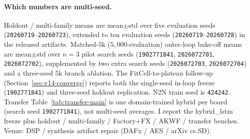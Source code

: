 \paragraph{Which numbers are multi-seed.}
Holdout / multi-family means are mean$\pm$std over five evaluation seeds (\texttt{20260719}--\texttt{20260723}), extended to ten evaluation seeds (\texttt{20260719}--\texttt{20260728}) in the released artifacts.
Matched-$5$k ($5{,}000$-evaluation) outer-loop bake-off means are mean$\pm$std over $n{=}3$ pilot search seeds (\texttt{1902771841}, \texttt{2026072701}, \texttt{2026072702}), supplemented by two extra search seeds (\texttt{2026072703}, \texttt{2026072704}) and a three-seed $5$k branch ablation.
The FitCell-to-plateau follow-up (Section~\ref{sec:v14-converge}) reports both the single-seed in-loop freeze (\texttt{1902771841}) and three-seed holdout replication.
N2N train seed is \texttt{424242}.
Transfer Table~\ref{tab:transfer-main} is one domain-trained hybrid per board (search seed \texttt{1902771841}), not multi-seed averages.
I report the hybrid\_lstm freeze plus holdout / multi-family / Factory+FX / AKWF / transfer benches.
Venue: DSP / synthesis artifact repair (DAFx / AES / arXiv cs.SD).

